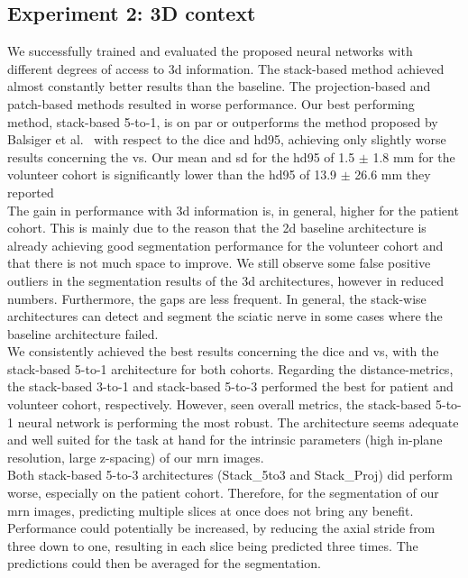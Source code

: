 \subsection{Experiment 2: 3D context}
We successfully trained and evaluated the proposed neural networks with different degrees of access to  \gls{3d} information. The stack-based method achieved almost constantly better results than the baseline. The projection-based and patch-based methods resulted in worse performance. Our best performing method, stack-based 5-to-1, is on par or outperforms the method proposed by Balsiger et al.~\cite{Balsiger2018SegmentationApproach} with respect to the \acrlong{dice} and \acrlong{hd95}, achieving only slightly worse results concerning the \acrlong{vs}. Our mean and \gls{sd} for the \gls{hd95} of 1.5 $\pm$ 1.8 mm for the volunteer cohort is significantly lower than the \gls{hd95} of 13.9 $\pm$ 26.6 mm they reported\\
The gain in performance with \gls{3d} information is, in general, higher for the patient cohort. This is mainly due to the reason that the \gls{2d} baseline architecture is already achieving good segmentation performance for the volunteer cohort and that there is not much space to improve. We still observe some false positive outliers in the segmentation results of the \gls{3d} architectures, however in reduced numbers. Furthermore, the gaps are less frequent. In general, the stack-wise architectures can detect and segment the sciatic nerve in some cases where the baseline architecture failed.\\
We consistently achieved the best results concerning the \acrlong{dice} and \acrlong{vs}, with the stack-based 5-to-1 architecture for both cohorts. Regarding the distance-metrics, the stack-based 3-to-1 and stack-based 5-to-3 performed the best for patient and volunteer cohort, respectively. However, seen overall metrics, the stack-based 5-to-1 neural network is performing the most robust. The architecture seems adequate and well suited for the task at hand for the intrinsic parameters (high in-plane resolution, large z-spacing) of our \gls{mrn} images.\\
Both stack-based 5-to-3 architectures (Stack\_5to3 and Stack\_Proj) did perform worse, especially on the patient cohort. Therefore, for the segmentation of our \gls{mrn} images, predicting multiple slices at once does not bring any benefit. Performance could potentially be increased, by reducing the axial stride from three down to one, resulting in each slice being predicted three times. The predictions could then be averaged for the segmentation.
